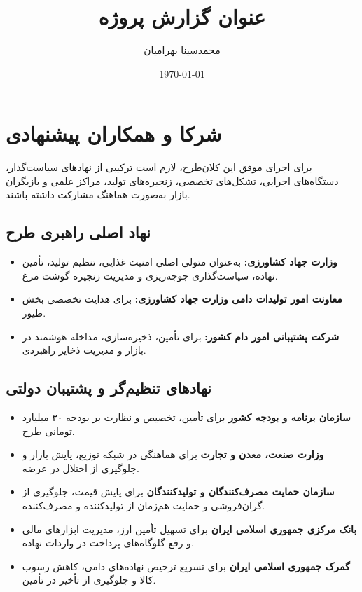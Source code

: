 \documentclass[12pt,a4paper]{report}
\title{عنوان گزارش پروژه}
\author{محمدسینا بهرامیان}
\date{\today}
\begin{document}
\maketitle

\tableofcontents

\chapter{شرکا و همکاران پیشنهادی}
برای اجرای موفق این کلان‌طرح، لازم است ترکیبی از نهادهای سیاست‌گذار، دستگاه‌های اجرایی، تشکل‌های تخصصی، زنجیره‌های تولید، مراکز علمی و بازیگران بازار به‌صورت هماهنگ مشارکت داشته باشند.

\section{نهاد اصلی راهبری طرح}
\begin{itemize}
    \item \textbf{وزارت جهاد کشاورزی:} به‌عنوان متولی اصلی امنیت غذایی، تنظیم تولید، تأمین نهاده، سیاست‌گذاری جوجه‌ریزی و مدیریت زنجیره گوشت مرغ.
    \item \textbf{معاونت امور تولیدات دامی وزارت جهاد کشاورزی:} برای هدایت تخصصی بخش طیور.
    \item \textbf{شرکت پشتیبانی امور دام کشور:} برای تأمین، ذخیره‌سازی، مداخله هوشمند در بازار و مدیریت ذخایر راهبردی.
\end{itemize}

\section{نهادهای تنظیم‌گر و پشتیبان دولتی}
\begin{itemize}
    \item \textbf{سازمان برنامه و بودجه کشور} برای تأمین، تخصیص و نظارت بر بودجه ۳۰ میلیارد تومانی طرح.
    \item \textbf{وزارت صنعت، معدن و تجارت} برای هماهنگی در شبکه توزیع، پایش بازار و جلوگیری از اختلال در عرضه.
    \item \textbf{سازمان حمایت مصرف‌کنندگان و تولیدکنندگان} برای پایش قیمت، جلوگیری از گران‌فروشی و حمایت هم‌زمان از تولیدکننده و مصرف‌کننده.
    \item \textbf{بانک مرکزی جمهوری اسلامی ایران} برای تسهیل تأمین ارز، مدیریت ابزارهای مالی و رفع گلوگاه‌های پرداخت در واردات نهاده.
    \item \textbf{گمرک جمهوری اسلامی ایران} برای تسریع ترخیص نهاده‌های دامی، کاهش رسوب کالا و جلوگیری از تأخیر در تأمین.
\end{itemize}
\end{document}
